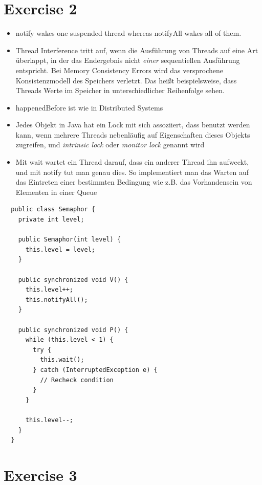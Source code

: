 \documentclass[10pt,a4paper]{article}
\begin{document}
\section*{Exercise 2}

\begin{itemize}
\item notify wakes one suspended thread whereas notifyAll wakes all of them.
\item Thread Interference tritt auf, wenn die Ausführung von Threads auf eine Art überlappt, in der das Endergebnis nicht \emph{einer} sequentiellen Ausführung entspricht.
  Bei Memory Consistency Errors wird das versprochene Konsistenzmodell des Speichers verletzt.
  Das heißt beispielsweise, dass Threads Werte im Speicher in unterschiedlicher Reihenfolge sehen.
\item happenedBefore ist wie in Distributed Systems
\item Jedes Objekt in Java hat ein Lock mit sich assoziiert, dass benutzt werden kann, wenn mehrere Threads nebenläufig auf Eigenschaften dieses Objekts zugreifen, und \emph{intrinsic lock} oder \emph{monitor lock} genannt wird
\item Mit wait wartet ein Thread darauf, dass ein anderer Thread ihn aufweckt, und mit notify tut man genau dies.
  So implementiert man das Warten auf das Eintreten einer bestimmten Bedingung wie z.B. das Vorhandensein von Elementen in einer Queue
\end{itemize}

\begin{verbatim}
  public class Semaphor {
    private int level;

    public Semaphor(int level) {
      this.level = level;
    }

    public synchronized void V() {
      this.level++;
      this.notifyAll();
    }

    public synchronized void P() {
      while (this.level < 1) {
        try {
          this.wait();
        } catch (InterruptedException e) {
          // Recheck condition
        }
      }

      this.level--;
    }
  }
\end{verbatim}

\section*{Exercise 3}

\inputminted{c}{sheet-6/fabrik.c}
\end{document}

